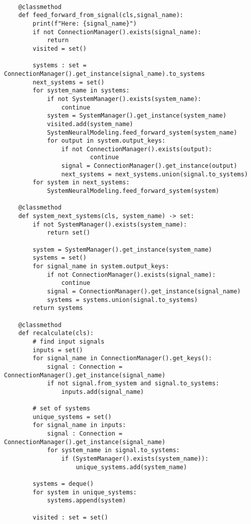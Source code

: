 \begin{verbatim}
    
    @classmethod
    def feed_forward_from_signal(cls,signal_name):
        print(f"Here: {signal_name}")
        if not ConnectionManager().exists(signal_name):
            return
        visited = set()
        
        systems : set = ConnectionManager().get_instance(signal_name).to_systems
        next_systems = set()
        for system_name in systems:
            if not SystemManager().exists(system_name):
                continue
            system = SystemManager().get_instance(system_name)
            visited.add(system_name)
            SystemNeuralModeling.feed_forward_system(system_name)
            for output in system.output_keys:
                if not ConnectionManager().exists(output):
                        continue
                signal = ConnectionManager().get_instance(output)
                next_systems = next_systems.union(signal.to_systems)
        for system in next_systems:
            SystemNeuralModeling.feed_forward_system(system)
    
    @classmethod
    def system_next_systems(cls, system_name) -> set:
        if not SystemManager().exists(system_name):
            return set()
        
        system = SystemManager().get_instance(system_name)
        systems = set()
        for signal_name in system.output_keys:
            if not ConnectionManager().exists(signal_name):
                continue
            signal = ConnectionManager().get_instance(signal_name)
            systems = systems.union(signal.to_systems)
        return systems
    
    @classmethod
    def recalculate(cls):
        # find input signals
        inputs = set()
        for signal_name in ConnectionManager().get_keys():
            signal : Connection = ConnectionManager().get_instance(signal_name)
            if not signal.from_system and signal.to_systems:
                inputs.add(signal_name)
        
        # set of systems
        unique_systems = set()
        for signal_name in inputs:
            signal : Connection = ConnectionManager().get_instance(signal_name)
            for system_name in signal.to_systems:
                if (SystemManager().exists(system_name)):
                    unique_systems.add(system_name)
        
        systems = deque()
        for system in unique_systems:
            systems.append(system)
        
        visited : set = set()
        

\end{verbatim}
